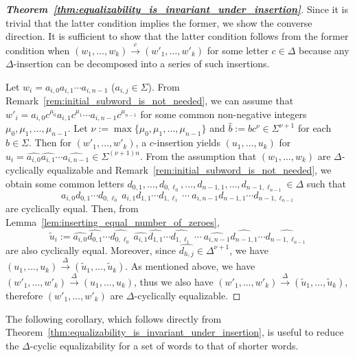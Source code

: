 \documentclass{article}
\theoremstyle{definition}
\newcommand{\insto}[1]{\overset{{#1}}{\to}}
\begin{document}
\begin{proof}
    [\textbf{Theorem~\ref{thm:equalizability_is_invariant_under_insertion}}]
    Since it is trivial that the latter condition implies the former, we show the converse direction. 
    It is sufficient to show that the latter condition follows from the former condition when $(w_1,\dots,w_k)\insto{c} (w'_1,\dots,w'_k)$ for some letter $c \in \Delta$ because any $\Delta$-insertion can be decomposed into a series of such insertions. 

    Let $w_i = a_{i,0} a_{i,1} \cdots a_{i,n-1}$ ($a_{i,j} \in \Sigma$). 
    From Remark~\ref{rem:initial_subword_is_not_needed}, we can assume that $w'_i = a_{i,0} c^{\mu_0} a_{i,1} c^{\mu_1} \cdots a_{i,n-1} c^{\mu_{n-1}}$ for some common non-negative integers $\mu_0,\mu_1,\dots,\mu_{n-1}$. 
    Let $\nu := \max\{\mu_0,\mu_1,\dots,\mu_{n-1}\}$ and $\widehat{b} := b c^{\nu} \in \Sigma^{\nu+1}$ for each $b \in \Sigma$. 
    Then for $(w'_1,\dots,w'_k)$, a $c$-insertion yields $(u_1, \dots, u_k)$ for $u_i = \widehat{a_{i,0}} \widehat{a_{i,1}} \cdots \widehat{a_{i,n-1}} \in \Sigma^{(\nu+1)n}$. 
    From the assumption that $(w_1,\dots,w_k)$ are $\Delta$-cyclically equalizable and Remark~\ref{rem:initial_subword_is_not_needed}, we obtain 
    some common letters $d_{0,1},\dots,d_{0,\ell_0},\allowbreak\dots,d_{n-1,1},\dots,d_{n-1,\ell_{n-1}} \in \Delta$ such that 
    \[
    a_{i,0} d_{0,1} \cdots d_{0,\ell_0}~a_{i,1} d_{1,1} \cdots d_{1,\ell_1}~\cdots~a_{i,n-1} d_{n-1,1} \cdots d_{n-1,\ell_{n-1}}
    \]
    are cyclically equal. 
    Then, from Lemma~\ref{lem:inserting_equal_number_of_zeroes}, 
    \[
    \widetilde{u}_i 
    := \widehat{a_{i,0}} \widehat{d_{0,1}} \cdots \widehat{d_{0,\ell_0}}~\widehat{a_{i,1}} \widehat{d_{1,1}}\cdots \widehat{d_{1,\ell_1}}~ \cdots ~\widehat{a_{i,n-1}} \widehat{d_{n-1,1}} \cdots \widehat{d_{n-1,\ell_{n-1}}}
    \]
    are also cyclically equal. 
    Moreover, since $\widehat{d_{h,j}} \in \Delta^{\nu+1}$, we have 
    $(u_1,\dots,u_k) \insto{\Delta} (\widetilde{u}_1,\dots,\widetilde{u}_k)$. 
    As mentioned above, we have $(w'_1,\dots,w'_k) \insto{\Delta} (u_1,\dots,u_k)$, thus we also have 
    $(w'_1,\dots,w'_k) \insto{\Delta} (\widetilde{u}_1,\dots,\widetilde{u}_k)$, 
    therefore $(w'_1,\dots,w'_k)$ are $\Delta$-cyclically equalizable.
\end{proof}

The following corollary, which follows directly from Theorem~\ref{thm:equalizability_is_invariant_under_insertion}, is useful to reduce the $\Delta$-cyclic equalizability for a set of words to that of shorter words. 
\end{document}
